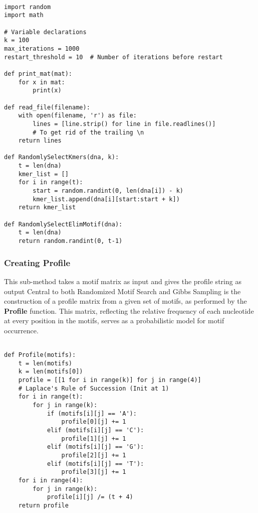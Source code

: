 \begin{verbatim}

import random
import math

# Variable declarations
k = 100
max_iterations = 1000
restart_threshold = 10  # Number of iterations before restart

def print_mat(mat):
    for x in mat:
        print(x)

def read_file(filename):
    with open(filename, 'r') as file:
        lines = [line.strip() for line in file.readlines()] 
        # To get rid of the trailing \n
    return lines

def RandomlySelectKmers(dna, k):
    t = len(dna)
    kmer_list = []
    for i in range(t):
        start = random.randint(0, len(dna[i]) - k)
        kmer_list.append(dna[i][start:start + k])
    return kmer_list

def RandomlySelectElimMotif(dna):
    t = len(dna)
    return random.randint(0, t-1)

\end{verbatim}

\subsubsection{Creating Profile}

This sub-method takes a motif matrix as input and gives the profile string as output
Central to both Randomized Motif Search and Gibbs Sampling is the construction of a profile matrix from a given set of motifs, as performed by the \textbf{Profile} function. This matrix, reflecting the relative frequency of each nucleotide at every position in the motifs, serves as a probabilistic model for motif occurrence.

\begin{verbatim}

def Profile(motifs):
    t = len(motifs)
    k = len(motifs[0])
    profile = [[1 for i in range(k)] for j in range(4)] 
    # Laplace's Rule of Succession (Init at 1)
    for i in range(t):
        for j in range(k):
            if (motifs[i][j] == 'A'):
                profile[0][j] += 1
            elif (motifs[i][j] == 'C'):
                profile[1][j] += 1
            elif (motifs[i][j] == 'G'):
                profile[2][j] += 1
            elif (motifs[i][j] == 'T'):
                profile[3][j] += 1
    for i in range(4):
        for j in range(k):
            profile[i][j] /= (t + 4)
    return profile
    
\end{verbatim}

